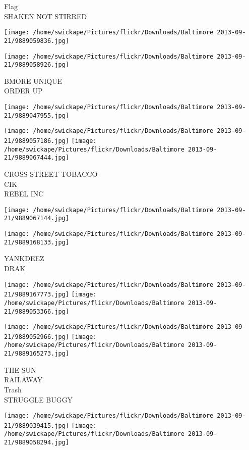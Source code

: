 \documentclass[10pt,letterpaper]{article}
\begin{document}
Flag\\
SHAKEN NOT STIRRED
\pagebreak

\texttt{[image: /home/swickape/Pictures/flickr/Downloads/Baltimore 2013-09-21/9889059836.jpg]}

\vspace{0.25in}
\texttt{[image: /home/swickape/Pictures/flickr/Downloads/Baltimore 2013-09-21/9889058926.jpg]}

BMORE UNIQUE\\
ORDER UP
\pagebreak

\texttt{[image: /home/swickape/Pictures/flickr/Downloads/Baltimore 2013-09-21/9889047955.jpg]}

\vspace{0.25in}
\texttt{[image: /home/swickape/Pictures/flickr/Downloads/Baltimore 2013-09-21/9889057186.jpg]}
\texttt{[image: /home/swickape/Pictures/flickr/Downloads/Baltimore 2013-09-21/9889067444.jpg]}

CROSS STREET TOBACCO\\
CIK\\
REBEL INC
\pagebreak

\texttt{[image: /home/swickape/Pictures/flickr/Downloads/Baltimore 2013-09-21/9889067144.jpg]}

\vspace{0.25in}
\texttt{[image: /home/swickape/Pictures/flickr/Downloads/Baltimore 2013-09-21/9889168133.jpg]}

YANKDEEZ\\
DRAK
\pagebreak

\texttt{[image: /home/swickape/Pictures/flickr/Downloads/Baltimore 2013-09-21/9889167773.jpg]}
\texttt{[image: /home/swickape/Pictures/flickr/Downloads/Baltimore 2013-09-21/9889053366.jpg]}

\texttt{[image: /home/swickape/Pictures/flickr/Downloads/Baltimore 2013-09-21/9889052966.jpg]}
\texttt{[image: /home/swickape/Pictures/flickr/Downloads/Baltimore 2013-09-21/9889165273.jpg]}

THE SUN\\
RAILAWAY\\
Trash\\
STRUGGLE BUGGY
\pagebreak

\texttt{[image: /home/swickape/Pictures/flickr/Downloads/Baltimore 2013-09-21/9889039415.jpg]}
\texttt{[image: /home/swickape/Pictures/flickr/Downloads/Baltimore 2013-09-21/9889058294.jpg]}
\end{document}
